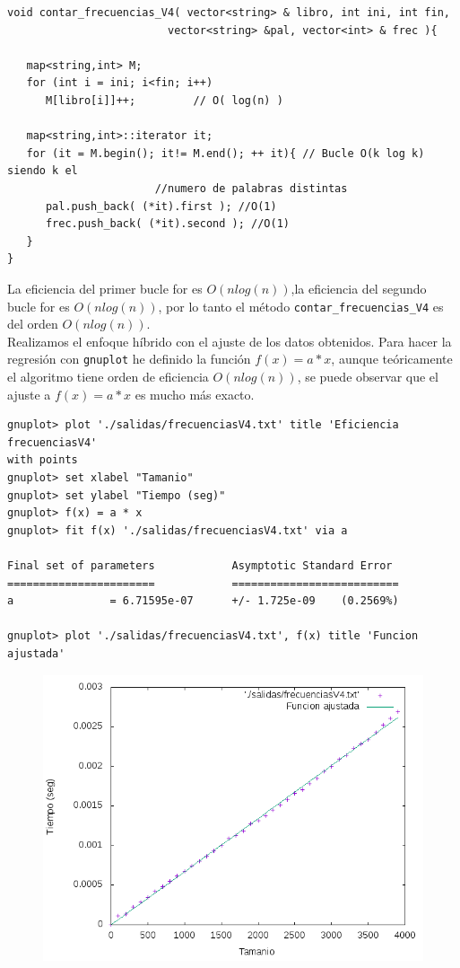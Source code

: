 \documentclass[11pt]{article}
\begin{document}
\begin{verbatim}
void contar_frecuencias_V4( vector<string> & libro, int ini, int fin,
                         vector<string> &pal, vector<int> & frec ){

   map<string,int> M;
   for (int i = ini; i<fin; i++)
      M[libro[i]]++;         // O( log(n) )

   map<string,int>::iterator it;
   for (it = M.begin(); it!= M.end(); ++ it){ // Bucle O(k log k) siendo k el 
   					   //numero de palabras distintas
      pal.push_back( (*it).first ); //O(1)
      frec.push_back( (*it).second ); //O(1)
   }
}
\end{verbatim}


La eficiencia del primer bucle for es $O(n log (n))$,la eficiencia del segundo bucle for es $O(n log(n))$, por lo tanto el método \texttt{contar\_frecuencias\_V4} es del orden $O(n log(n))$.\\

Realizamos el enfoque híbrido con el ajuste de los datos obtenidos. Para hacer la regresión con \texttt{gnuplot} he definido la función $f(x) = a * x$, aunque teóricamente el algoritmo tiene orden de eficiencia $O(n log(n))$, se puede observar que el ajuste a $f(x) = a * x$ es mucho más exacto.

\begin{verbatim}
gnuplot> plot './salidas/frecuenciasV4.txt' title 'Eficiencia frecuenciasV4' 
with points
gnuplot> set xlabel "Tamanio"
gnuplot> set ylabel "Tiempo (seg)"
gnuplot> f(x) = a * x
gnuplot> fit f(x) './salidas/frecuenciasV4.txt' via a

Final set of parameters            Asymptotic Standard Error
=======================            ==========================
a               = 6.71595e-07      +/- 1.725e-09    (0.2569%)

gnuplot> plot './salidas/frecuenciasV4.txt', f(x) title 'Funcion ajustada'
\end{verbatim}

\begin{figure}[H]
\begin{center}
\includegraphics[width=12cm]{../salidas/frecuenciasV4.png}
\end{center}
\end{figure}
\end{document}
